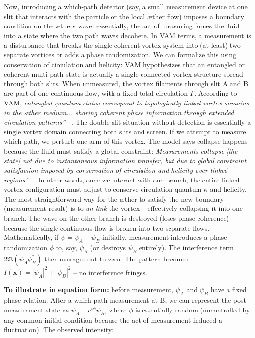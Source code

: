 \documentclass[a4paper, aps,preprint,superscriptaddress, 12pt]{revtex4}
\begin{document}
Now, introducing a which-path detector (say, a small measurement device at one slit that interacts with the particle or the local æther flow) imposes a boundary condition on the æther\rqs s wave: essentially, the act of measuring forces the fluid into a state where the two path waves decohere. In VAM terms, a measurement is a disturbance that breaks the single coherent vortex system into (at least) two separate vortices or adds a phase randomization. We can formalize this using conservation of circulation and helicity: VAM hypothesizes that an entangled or coherent multi-path state is actually a single connected vortex structure spread through both slits. When unmeasured, the vortex filaments through slit A and B are part of one continuous flow, with a fixed total circulation $\Gamma$. According to VAM, \textit{\grqq entangled quantum states correspond to topologically linked vortex domains in the æther medium... sharing coherent phase information through extended circulation patterns\textquotedblright}~\cite{Iskandarani2025c} . The double-slit situation without detection is essentially a single vortex domain connecting both slits and screen. If we attempt to measure which path, we perturb one arm of this vortex. The model says collapse happens because the fluid must satisfy a global constraint: \textit{\grqq Measurements collapse [the state] not due to instantaneous information transfer, but due to global constraint satisfaction imposed by conservation of circulation and helicity over linked regions\textquotedblright}~\cite{Iskandarani2025c} . In other words, once we interact with one branch, the entire linked vortex configuration must adjust to conserve circulation quantum $\kappa$ and helicity. The most straightforward way for the æther to satisfy the new boundary (measurement result) is to \textit{un-link} the vortex – effectively collapsing it into one branch. The wave on the other branch is destroyed (loses phase coherence) because the single continuous flow is broken into two separate flows. Mathematically, if $\psi = \psi_A + \psi_B$ initially, measurement introduces a phase randomization $\phi$ to, say, $\psi_B$ (or destroys $\psi_B$ entirely). The interference term $2\Re(\psi_A\psi_B^*)$ then averages out to zero. The pattern becomes $I(\mathbf{x}) = |\psi_A|^2 + |\psi_B|^2$ – no interference fringes.


\textbf{To illustrate in equation form:} before measurement, $\psi_A$ and $\psi_B$ have a fixed phase relation. After a which-path measurement at B, we can represent the post-measurement state as $\psi_A + e^{i\phi}\psi_B$, where $\phi$ is essentially random (uncontrolled by any common initial condition because the act of measurement induced a fluctuation). The observed intensity:
\end{document}
